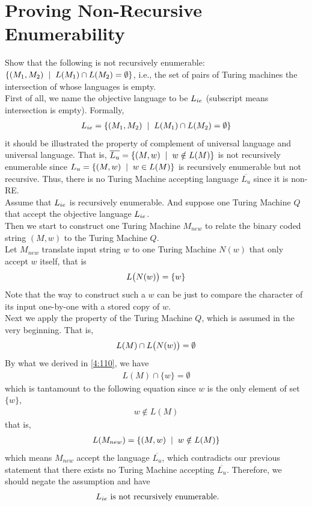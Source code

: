 \documentclass[11pt,a4paper]{article}
\newcommand{\htab}{\hspace*{0.63cm}}
\newcommand{\ba}{\hspace*{0.2cm} | \hspace*{0.2cm}}
\newcommand{\pg}{\\[0.3cm]}
\newcommand{\lu}{L_{u}}
\newcommand{\clu}{\overline{L_{u}} }
\begin{document}
\section{Proving Non-Recursive Enumerability}
Show that the following is not recursively enumerable: $\{(M_{1}, M_{2}) \ba L(M_{1}) \cap L(M_{2}) = \emptyset \}$, i.e., the set
of pairs of Turing machines the intersection of whose languages is empty. \pg
\htab First of all, we name the objective language to be $L_{ie}$ (subscript means intersection is empty). Formally,
\begin{align}
    \lie = \{(M_{1}, M_{2}) \ba L(M_{1}) \cap L(M_{2}) = \emptyset \}
    \end{align}
\htab it should be illustrated the property of complement of universal language and universal language. That is,  $\clu = \{ (M,w) \ba w \notin L(M) \}$ is not recursively enumerable since $\lu = \{ (M,w) \ba w \in L(M)\}$ is recursively enumerable but not recursive. Thus, there is no Turing Machine accepting language $\clu$ since it is non-RE. \\
\htab Assume that $L_{ie}$ is recursively enumerable. And suppose one Turing Machine $Q$ that accept the objective language $L_{ie}$. \\
\htab Then we start to construct one Turing Machine $M_{new}$ to relate the binary coded string $(M,w)$ to 
the Turing Machine $Q$. \\
\htab Let $M_{new}$ translate input string $w$ to one Turing Machine $N(w)$ that only accept $w$ itself, that is
\begin{align}
    L\big(N(w)\big) = \{ w \} \label{4:110}
    \end{align}
\htab Note that the way to construct such a $w$ can be just to compare the character of its input 
 one-by-one with a stored copy of $w$. \\
\htab Next we apply the property of the Turing Machine $Q$, which is assumed in the very beginning. That is,
\begin{align}
    L(M) \cap L\big(N(w)\big) = \emptyset
    \end{align}
\htab By what we derived in \eqref{4:110}, we have
\begin{align}
    L(M) \cap \{w\} = \emptyset
    \end{align}
    \htab which is tantamount to the following equation since $w$ is the only element of set $\{w\}$,
\begin{align}
    w \notin L(M)
    \end{align}
\htab that is,
\begin{align}
    L(M_{new}) = \{ (M, w) \ba w \notin L(M) \}
    \end{align}
\htab which means $M_{new}$ accept the language $\clu$, which contradicts our previous statement that
there exists no Turing Machine accepting $\clu$. Therefore, we should negate the assumption and have
\begin{align}
    \text{ $L_{ie}$ is not recursively enumerable}.
   \end{align}
\newpage 
\newcommand{\x}[1]{x_{#1}}
\newcommand{\n}[1]{\overset{-}{x_{#1}}}
\end{document}
